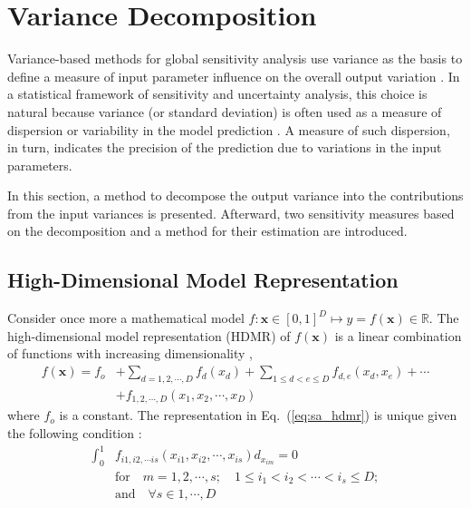 \section{Variance Decomposition}\label{sec:sa_variance_decomposition}

Variance-based methods for global sensitivity analysis use variance as the basis to define a measure of input parameter influence on the overall output variation \cite{Cacuci2004}.
In a statistical framework of sensitivity and uncertainty analysis, 
this choice is natural because variance (or standard deviation) is often used as a measure of dispersion or variability in the model prediction \cite{Saltelli2008}.
A measure of such dispersion, in turn, indicates the precision of the prediction due to variations in the input parameters.

In this section, a method to decompose the output variance into the contributions from the input variances is presented.
Afterward, two sensitivity measures based on the decomposition and a method for their estimation are introduced.

\subsection{High-Dimensional Model Representation}\label{sub:sa_hdmr}

Consider once more a mathematical model $f: \mathbf{x} \in [0,1]^D \mapsto y = f(\mathbf{x}) \in \mathbb{R}$.
The high-dimensional model representation (HDMR) of $f(\mathbf{x})$ is a linear combination of functions with increasing dimensionality \cite{Li2001},
\begin{equation}
	\begin{split}
		f(\mathbf{x}) = f_o & + \sum_{d=1,2, \cdots, D} f_d(x_d) + \sum_{1\leq d < e \leq D} f_{d,e} (x_d, x_e) + \cdots  \\
	                      & + f_{1,2,\cdots,D} (x_1, x_2, \cdots, x_D)
	\end{split}
\label{eq:sa_hdmr}
\end{equation}
where $f_o$ is a constant. 
The representation in Eq.~(\ref{eq:sa_hdmr}) is unique given the following condition \cite{Sobol2001}:
\begin{equation}
  \begin{split}
    \int_{0}^{1} & f_{i1, i2, \cdots is}(x_{i1}, x_{i2}, \cdots, x_{is}) d_{x_{im}} = 0  \\
                 & \text{for}\quad m = 1,2,\cdots,s;\quad 1\leq i_1 < i_2 < \cdots < i_s \leq D; \\
                 & \text{and}\quad \forall s \in {1,\cdots,D}
   \end{split}
\label{eq:sa_unicity}
\end{equation}

